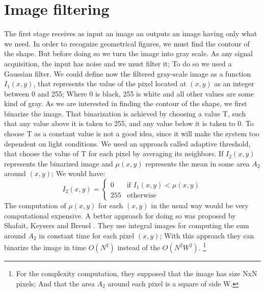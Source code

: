 \documentclass[10pt,journal]{IEEEtran}
\begin{document}
	\section{Image filtering}
	The first stage receives as input an image an outputs an image having only
	what we need. In order to recognize geometrical figures, we must find the 
	contour of the shape. But before doing so we turn the image into gray scale.
	As any signal acquisition, the input has noise and we must filter it; To do
	so we used a Gaussian filter. We could define now the filtered gray-scale image
	as a function $I_1(x,y)$, that represents the value of the pixel located at
	$(x,y)$ as an integer between 0 and 255; Where 0 is black, 255 is white and
	all other values are some kind of gray.\newline
	As we are interested in finding the contour of the shape, we first binarize
	the image. That binarization is achieved by choosing a value T, such that any
	value above it is taken to 255, and any value below it is taken to 0.
	To choose T as a constant value is not a good idea, since it will make the
	system too dependent on light conditions. We used an approach called
	adaptive threshold, that choose the value of T for each pixel by averaging
	its neighbors. If $I_2(x,y)$ represents the binarized image and $\mu(x,y)$
	represents the mean in some area $A_2$ around $(x,y)$; We would have:
	\[ I_2(x,y) = \left\{ \begin{array}{ll}
		0   & \mbox{if $I_1(x,y) < \mu(x,y)$} \\
		255 & \mbox{otherwise}
	\end{array} \right. \]
	The computation of $\mu(x,y)$ for each $(x,y)$ in the usual way would
	be very computational expensive. A better approach for doing so was proposed by
	Shafait, Keysers and Breuel \cite{ocropus2}. They use integral images for computing
	the sum around $A_2$ in constant time for each pixel $(x,y)$; With this approach they
	can binarize the image in time $O(N^2)$ instead of the $O(N^2W^2).$ \footnote{For the
	complexity computation, they supposed that the image has size NxN pixels; And that
	the area $A_2$ around each pixel is a square of side W.}
	
\end{document}
